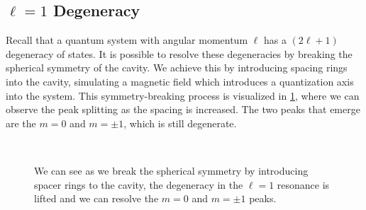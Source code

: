 \documentclass[12pt]{article}
\begin{document}
	\subsection{$\ell=1$ Degeneracy}
	Recall that a quantum system with angular momentum $\ell$ has a $(2\ell+1)$ degeneracy of states. It is possible to resolve these degeneracies by breaking the spherical symmetry of the cavity. We achieve this by introducing spacing rings into the cavity, simulating a magnetic field which introduces a quantization axis into the system. This symmetry-breaking process is visualized in \cref{degenResolution}, where we can observe the peak splitting as the spacing is increased. The two peaks that emerge are the $m=0$ and $m=\pm1$, which is still degenerate.
	
	\begin{figure}[H]
		\centering
		\qquad
		\\
		\qquad
		\caption{We can see as we break the spherical symmetry by introducing spacer rings to the cavity, the degeneracy in the $\ell=1$ resonance is lifted and we can resolve the $m = 0$ and $m = \pm1$ peaks.}
		\label{degenResolution}
	\end{figure}
\end{document}
